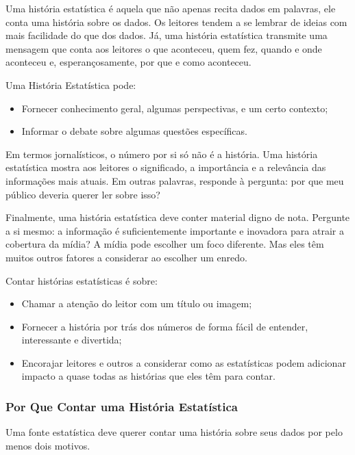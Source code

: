 Uma história estatística é aquela que não apenas recita dados em palavras, ele conta uma história sobre os dados. Os leitores tendem a se lembrar de ideias com mais facilidade do que dos dados. Já, uma história estatística transmite uma mensagem que conta aos leitores o que aconteceu, quem fez, quando e onde aconteceu e, esperançosamente, por que e como aconteceu.\vskip0.3cm 


Uma História Estatística pode:

\begin{itemize}
    \item Fornecer conhecimento geral, algumas perspectivas, e um certo contexto;
    \item Informar o debate sobre algumas questões específicas.
\end{itemize}


Em termos jornalísticos, o número por si só não é a história. Uma história estatística mostra aos leitores o significado, a importância e a relevância das informações mais atuais. Em outras palavras, responde à pergunta: por que meu público deveria querer ler sobre isso?\vskip0.3cm 

Finalmente, uma história estatística deve conter material digno de nota. Pergunte a si mesmo: a informação é suficientemente importante e inovadora para atrair a cobertura da mídia? A mídia pode escolher um foco diferente. Mas eles têm muitos outros fatores a considerar ao escolher um enredo.


Contar histórias estatísticas é sobre:

\begin{itemize}
    \item Chamar a atenção do leitor com um título ou imagem;
    \item Fornecer a história por trás dos números de forma fácil de entender, interessante e divertida;
    \item Encorajar leitores e outros a considerar como as estatísticas podem adicionar impacto a quase todas as histórias que eles têm para contar.
\end{itemize}




\subsubsection{Por Que Contar uma História Estatística}

Uma fonte estatística deve querer contar uma história sobre seus dados por pelo menos dois motivos. \vskip0.3cm 

